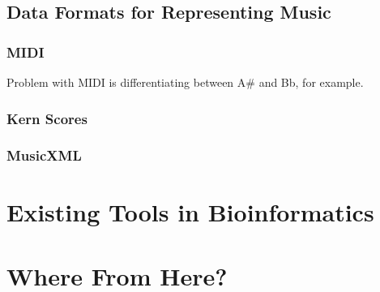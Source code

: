\subsection{Data Formats for Representing Music}

\subsubsection{MIDI}

Problem with MIDI is differentiating between A\# and Bb, for example.

\subsubsection{Kern Scores}

\subsubsection{MusicXML}

\section{Existing Tools in Bioinformatics}

\section{Where From Here?}

